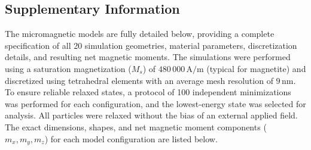 \documentclass[11pt,a4paper]{article}
\begin{document}
\begin{landscape}
\section*{Supplementary Information}

The micromagnetic models are fully detailed below, providing a complete specification of all 20 simulation geometries, material parameters, discretization details, and resulting net magnetic moments. The simulations were performed using a saturation magnetization ($M_s$) of $480\,000\,\text{A/m}$ (typical for magnetite) and discretized using tetrahedral elements with an average mesh resolution of $9\,\text{nm}$. To ensure reliable relaxed states, a protocol of 100 independent minimizations was performed for each configuration, and the lowest-energy state was selected for analysis. All particles were relaxed without the bias of an external applied field. The exact dimensions, shapes, and net magnetic moment components ($m_x, m_y, m_z$) for each model configuration are listed below. 



\end{landscape}
\end{document}
